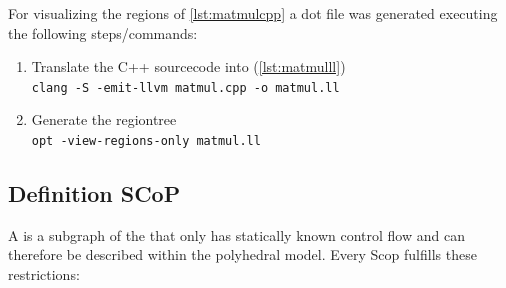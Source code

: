 For visualizing the regions of \autoref{lst:matmulcpp} a dot file was generated executing the following steps/commands:
\begin{enumerate}
    \item Translate the C++ sourcecode into \llvmir (\autoref{lst:matmulll})\\
        \texttt{clang -S -emit-llvm matmul.cpp -o matmul.ll}
    \item Generate the regiontree\\
        \texttt{opt -view-regions-only matmul.ll}
\end{enumerate}
\subsection{Definition SCoP}\label{subsec:definitionScop}

A \scop is a subgraph of the \cfg that only has statically known control flow and can therefore be described within the polyhedral model.
Every Scop fulfills these restrictions:
